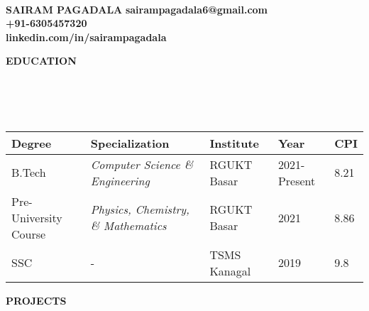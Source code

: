 \documentclass[a4paper,11pt]{article}
\newcommand{\lsep}{-0.5cm}
\newcommand{\resheading}[1]{{\small \colorbox{mygrey}{\begin{minipage}{0.975\textwidth}{\textbf{#1 \vphantom{p\^{E}}}}\end{minipage}}}}
\begin{document}
\hspace{0.5cm}\\[-1.8cm]

\textbf{SAIRAM PAGADALA} \hspace{8.0cm} {\bf sairampagadala6@gmail.com}\\
  \hspace{10.5 cm} {\bf +91-6305457320} \\
  \hspace{8.9 cm} {\bf linkedin.com/in/sairampagadala} \\

\vspace{-2mm}
\resheading{\textbf{EDUCATION} }\\[\lsep]\\ \\
\indent \begin{tabular}{ p{2.5cm} @{\hskip 0.15in} p{5.5cm} @{\hskip 0.15in} p{3.5cm} @{\hskip 0.15in} p{2.5cm} @{\hskip 0.15in} p{1.5cm} }
\toprule
\textbf{Degree} & \textbf{Specialization} & \textbf{Institute} & \textbf{Year} & \textbf{CPI} \\
\midrule
B.Tech & \textit{Computer Science \& Engineering} & RGUKT Basar & 2021-Present & 8.21 \\
Pre-University Course & \textit{Physics, Chemistry, \& Mathematics} & RGUKT Basar & 2021 & 8.86\\
SSC  & - & TSMS Kanagal & 2019 & 9.8\\
\bottomrule
\end{tabular}



\vspace{1mm}


\resheading{\textbf{PROJECTS}}
\end{document}
